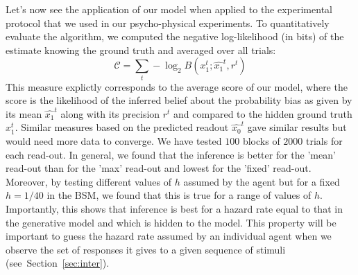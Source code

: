\documentclass[12pt,english]{article}%
\newcommand{\eql}[1]{\begin{equation}#1\end{equation}}
\newcommand{\Cc}{\mathcal{C}}
\newcommand{\seeSec}[1]{Section~\ref{sec:#1}}
\begin{document}
Let's now see the application of our model when applied
to the experimental protocol
that we used in our psycho-physical experiments.
To quantitatively evaluate the algorithm,
we computed the  negative log-likelihood (in bits) of the estimate
knowing the ground truth 
and averaged over all trials:
\eql{
\Cc =  \sum_{t} -\log_2 B(x_1^t ; \hat{x_1}^t, r^t )
\label{eq:MI}
}
This measure explictly corresponds to the average score of our model,
where the score is the likelihood of the inferred belief about the probability bias
as given by its mean $\hat{x_1}^t$ along with its precision $r^t$ and
compared to the hidden ground truth $x_1^t$. 
Similar measures based on the predicted readout $\hat{x_0}^t$
gave similar results but would need more data to converge.
We have tested $100$ blocks of $2000$ trials for each read-out.
In general, we found that the inference is better for the 'mean' read-out
than for the 'max' read-out and lowest for the 'fixed' read-out.
Moreover, by testing different values of $h$ assumed by the agent
but for a fixed $h=1/40$ in the BSM,
we found that this is true for a range of values of $h$.
Importantly, this shows that inference is best for a hazard rate
equal to that in the generative model and which is hidden to the model.
This property will be important to guess the hazard rate assumed by an individual agent
when we observe the set of responses it gives to a given sequence of stimuli
(see~\seeSec{inter}).
\end{document}
